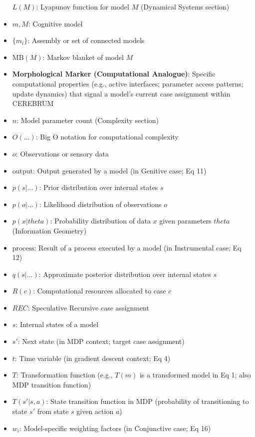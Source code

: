 \documentclass[
  11pt,
  letterpaper,
]{article}
\begin{document}
\begin{itemize}
  \(L(M)\): Lyapunov function for model \(M\) (Dynamical Systems
  section)
\item
  \(m, M\): Cognitive model
\item
  \(\{m_i\}\): Assembly or set of connected models
\item
  \(\text{MB}(M)\): Markov blanket of model \(M\)
\item
  \textbf{Morphological Marker (Computational Analogue)}: Specific
  computational properties (e.g., active interfaces; parameter access
  patterns; update dynamics) that signal a model's current case
  assignment within CEREBRUM
\item
  \(n\): Model parameter count (Complexity section)
\item
  \(O(...)\): Big O notation for computational complexity
\item
  \(o\): Observations or sensory data
\item
  \(\text{output}\): Output generated by a model (in Genitive case; Eq
  11)
\item
  \(p(s|...)\): Prior distribution over internal states \(s\)
\item
  \(p(o|...)\): Likelihood distribution of observations \(o\)
\item
  \(p(x|theta)\): Probability distribution of data \(x\) given
  parameters \(theta\) (Information Geometry)
\item
  \(\text{process}\): Result of a process executed by a model (in
  Instrumental case; Eq 12)
\item
  \(q(s|...)\): Approximate posterior distribution over internal states
  \(s\)
\item
  \(R(c)\): Computational resources allocated to case \(c\)
\item
  \(REC\): Speculative Recursive case assignment
\item
  \(s\): Internal states of a model
\item
  \(s'\): Next state (in MDP context; target case assignment)
\item
  \(t\): Time variable (in gradient descent context; Eq 4)
\item
  \(T\): Transformation function (e.g., \(T(m)\) is a transformed model
  in Eq 1; also MDP transition function)
\item
  \(T(s'|s,a)\): State transition function in MDP (probability of
  transitioning to state \(s'\) from state \(s\) given action \(a\))
\item
  \(w_i\): Model-specific weighting factors (in Conjunctive case; Eq 16)

\end{itemize}
\end{document}
